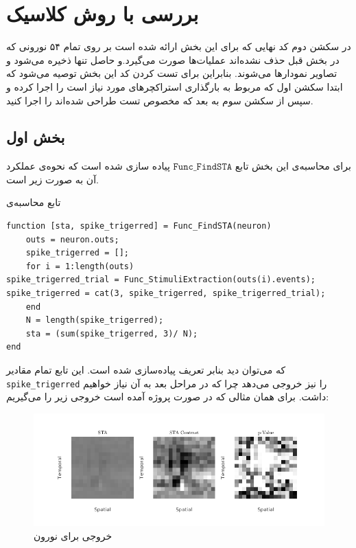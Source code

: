 \documentclass[12pt,onecolumn,a4paper,fleqn]{article}
\newcommand{\pf}[1]{$\mathtt{#1}$}
\begin{document}
\pagebreak

\section{بررسی با روش کلاسیک }

در سکشن دوم کد نهایی که برای این بخش ارائه شده‌ است بر روی تمام ۵۴ نورونی که در بخش قبل حذف نشده‌اند عملیات‌ها صورت می‌گیرد.و حاصل تنها ذخیره می‌شود و تصاویر نمودار‌ها  می‌شوند. بنابراین برای تست‌ کردن کد این بخش توصیه می‌شود که ابتدا سکشن اول که مربوط به بارگذاری استراکچر‌های مورد نیاز است را اجرا کرده و سپس از سکشن سوم به بعد که مخصوص تست طراحی شده‌اند را اجرا کنید.
\subsection{بخش اول}
برای محاسبه‌ی این بخش تابع \pf{Func\_FindSTA} پیاده سازی شده است که نحوه‌ی عملکرد آن به صورت زیر است.

\begin{code}{تابع محاسبه‌ی }
	\begin{latin}
		\begin{lstlisting}[style=Matlab-editor, tabsize=2]
function [sta, spike_trigerred] = Func_FindSTA(neuron)
	outs = neuron.outs;
	spike_trigerred = [];
	for i = 1:length(outs)
spike_trigerred_trial = Func_StimuliExtraction(outs(i).events);
spike_trigerred = cat(3, spike_trigerred, spike_trigerred_trial);
	end
	N = length(spike_trigerred);
	sta = (sum(spike_trigerred, 3)/ N);
end		\end{lstlisting}
	\end{latin}
\end{code}

که می‌توان دید بنابر تعریف  پیاده‌سازی شده است. این تابع تمام مقادیر 
\lstinline[style=Matlab-editor, tabsize=2]{spike_trigerred}
را نیز خروجی می‌دهد چرا که در مراحل بعد به آن نیاز خواهیم داشت. برای همان مثالی که در صورت پروژه آمده است خروجی زیر را می‌گیریم:
\begin{figure}[h]
	\centering
	\includegraphics[width=0.5\linewidth]{photos/sta.png}
	\caption{خروجی برای نورون }
\end{figure}
\end{document}
